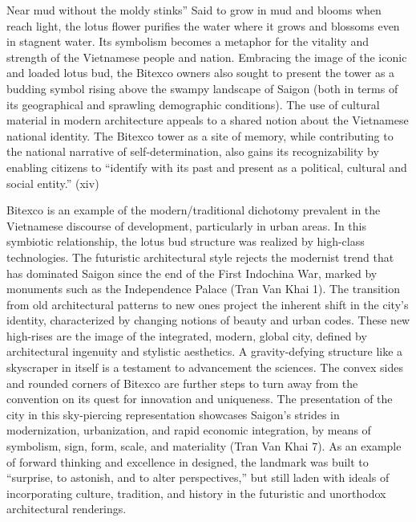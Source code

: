 Near mud without the moldy stinks” 
Said to grow in mud and blooms when reach light, the lotus flower purifies the water where it grows and blossoms even in stagnent water. Its symbolism becomes a metaphor for the vitality and strength of the Vietnamese people and nation.  Embracing the image of the iconic and loaded lotus bud, the Bitexco owners also sought to present the tower as a budding symbol rising above the swampy landscape of Saigon (both in terms of its geographical and sprawling demographic conditions). The use of cultural material in modern architecture appeals to a shared notion about the Vietnamese national identity.  The Bitexco tower as a site of memory, while contributing to the national narrative of self-determination, also gains its recognizability by enabling citizens to “identify with its past and present as a political, cultural and social entity.” (xiv) 

Bitexco is an example of the modern/traditional dichotomy prevalent in the Vietnamese discourse of development, particularly in urban areas. In this symbiotic relationship, the lotus bud structure was realized by high-class technologies. The futuristic architectural style rejects the modernist trend that has dominated Saigon since the end of the First Indochina War, marked by monuments such as the Independence Palace (Tran Van Khai 1). The transition from old architectural patterns to new ones project the inherent shift in the city’s identity, characterized by changing notions of beauty and urban codes. These new high-rises are the image of the integrated, modern, global city, defined by architectural ingenuity and stylistic aesthetics. A gravity-defying structure like a skyscraper in itself is a testament to advancement the sciences. The convex sides and rounded corners of Bitexco are further steps to turn away from the convention on its quest for innovation and uniqueness.  The presentation of the city in this sky-piercing representation showcases Saigon’s strides in modernization, urbanization, and rapid economic integration, by means of symbolism, sign, form, scale, and materiality (Tran Van Khai 7). As an example of forward thinking and excellence in designed, the landmark was built to “surprise, to astonish, and to alter perspectives,” but still laden with ideals of incorporating culture, tradition, and history in the futuristic and unorthodox architectural renderings. 

